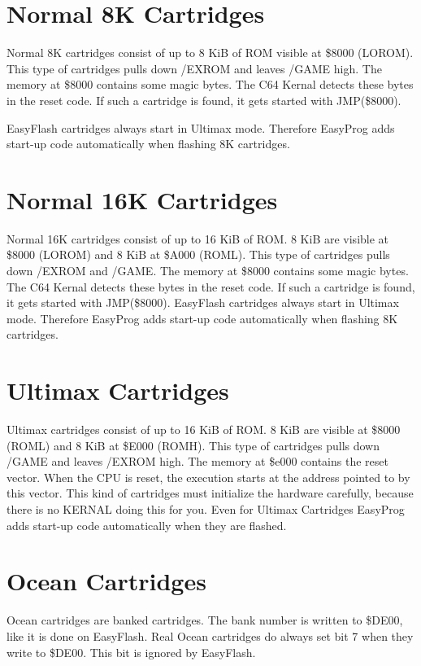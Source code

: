 \documentclass[a4paper,oneside]{memoir}
\begin{document}
\section {Normal 8K Cartridges}

Normal 8K cartridges consist of up to 8 KiB of ROM visible at \$8000 (LOROM).
This type of cartridges pulls down /EXROM and leaves /GAME high.
The memory at \$8000 contains some magic bytes. The C64 Kernal detects these
bytes in the reset code. If such a cartridge is found, it gets started with
JMP(\$8000).

EasyFlash cartridges always start in Ultimax mode. Therefore EasyProg adds
start-up code automatically when flashing 8K cartridges.

\section{Normal 16K Cartridges}

Normal 16K cartridges consist of up to 16 KiB of ROM. 8 KiB are visible at
\$8000 (LOROM) and 8 KiB at \$A000 (ROML). This type of cartridges pulls down
/EXROM and /GAME.
The memory at \$8000 contains some magic bytes. The C64 Kernal detects these
bytes in the reset code. If such a cartridge is found, it gets started with
JMP(\$8000).
EasyFlash cartridges always start in Ultimax mode. Therefore EasyProg adds
start-up code automatically when flashing 8K cartridges.

\section{Ultimax Cartridges}

Ultimax cartridges consist of up to 16 KiB of ROM. 8 KiB are visible at \$8000
(ROML) and 8 KiB at \$E000 (ROMH). This type of cartridges pulls down /GAME and
leaves /EXROM high.
The memory at \$e000 contains the reset vector. When the CPU is reset, the
execution starts at the address pointed to by this vector. This kind of
cartridges must initialize the hardware carefully, because there is no KERNAL
doing this for you.
Even for Ultimax Cartridges EasyProg adds start-up code automatically when they
are flashed.

\section{Ocean Cartridges}

Ocean cartridges are banked cartridges. The bank number is written to \$DE00,
like it is done on EasyFlash.
Real Ocean cartridges do always set bit 7 when they write to \$DE00. This bit
is ignored by EasyFlash.
\end{document}
